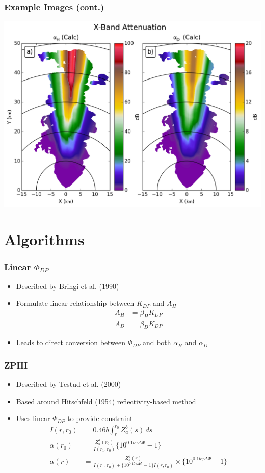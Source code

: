 \documentclass[red]{beamer}
\begin{document}
\begin{frame}
	\frametitle{Example Images (cont.)}
	\begin{center}
		\includegraphics[scale=0.4]{figures/X_Attenuation.png}
	\end{center}
\end{frame}

\section{Algorithms}
\begin{frame}
	\frametitle{Linear $\Phi_{DP}$}
	\begin{itemize}
		\item Described by Bringi et al. (1990)
		\item Formulate linear relationship between $K_{DP}$ and $A_H$
		\begin{align*}
			A_H &= \beta_H K_{DP} \\
			A_D &= \beta_D K_{DP}
		\end{align*}
		\item Leads to direct conversion between $\Phi_{DP}$  and  both
				$\alpha_H$ and $\alpha_D$
	\end{itemize}
\end{frame}

\begin{frame}
	\frametitle{ZPHI}
	\begin{itemize}
		\item Described by Testud et al. (2000)
		\item Based around Hitschfeld (1954) reflectivity-based method
		\item Uses linear $\Phi_{DP}$ to provide constraint
			\begin{align*}
			I(r, r_0) &= \num{0.46}b\int_r^{r_0}Z_a^b(s)\,ds \\
			\alpha(r_0) &= \frac{Z_a^b(r_0)}{I(r_1,r_0)} \lbrace 10^{\num{0.1}b\gamma\Delta\Phi} - 1\rbrace \\
			\alpha(r) &= \frac{Z_a^b(r)}{I(r_1,r_0) + \lbrace 10^{\num{0.1}b\gamma\Delta\Phi} - 1\rbrace I(r, r_0)}
			  \times \lbrace 10^{\num{0.1}b\gamma\Delta\Phi} - 1\rbrace
			\end{align*}
	\end{itemize}
\end{frame}
\end{document}
